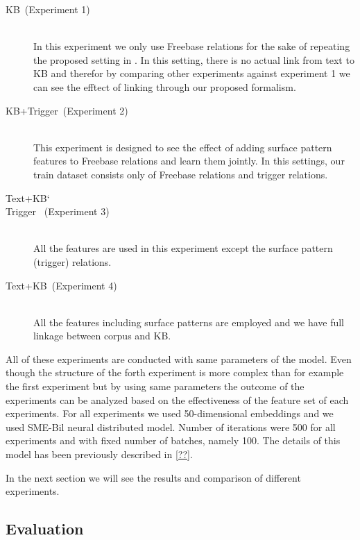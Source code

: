 \begin {description}
\item[KB~(Experiment 1)] \hfil \\
In this experiment we only use Freebase relations for the sake of repeating the
proposed setting in \cite{Bordes2011}. In this setting, there is no actual link
from text to KB and therefor by comparing other experiments against experiment 1
we can see the efftect of linking through our proposed formalism.
\item[KB+Trigger~(Experiment 2)] \hfill \\
This experiment is designed to see the effect of adding surface pattern features
to Freebase relations and learn them jointly. In this settings, our train
dataset consists only of Freebase relations and trigger relations.
\item[Text+KB\char`\\Trigger ~(Experiment 3)] \hfill \\
All the features are used in this experiment except
the surface pattern (trigger) relations. 
\item[Text+KB~(Experiment 4)] \hfill \\
All the features including surface patterns are employed and we have full
linkage between corpus and KB. 
\end{description}

All of these experiments are conducted with same parameters of the model. Even
though the structure of the forth experiment is more complex than for example
the first experiment but by using same parameters the outcome of the experiments
can be analyzed based on the effectiveness of the feature set of each
experiments. For all experiments we used 50-dimensional embeddings and we used
SME-Bil neural distributed model. Number of iterations were 500 for all
experiments and with fixed number of batches, namely 100. The details of this
model has been previously described in \autoref{??}.

In the next section we will see the results and comparison of different
experiments.


\subsection{Evaluation}
\label{ssec:textkb-exp-exp}

